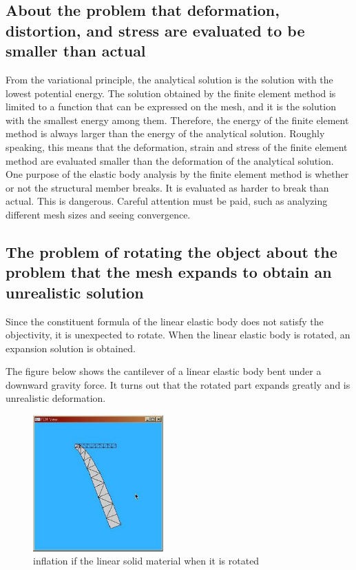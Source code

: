 \subsection{About the problem that deformation, distortion, and stress are evaluated to be smaller than actual}


From the variational principle, the analytical solution is the solution with the lowest potential energy. The solution obtained by the finite element method is limited to a function that can be expressed on the mesh, and it is the solution with the smallest energy among them. Therefore, the energy of the finite element method is always larger than the energy of the analytical solution. Roughly speaking, this means that the deformation, strain and stress of the finite element method are evaluated smaller than the deformation of the analytical solution. One purpose of the elastic body analysis by the finite element method is whether or not the structural member breaks. It is evaluated as harder to break than actual. This is dangerous. Careful attention must be paid, such as analyzing different mesh sizes and seeing convergence.

\subsection{The problem of rotating the object about the problem that the mesh expands to obtain an unrealistic solution}


Since the constituent formula of the linear elastic body does not satisfy the objectivity, it is unexpected to rotate.
When the linear elastic body is rotated, an expansion solution is obtained.

The figure below shows the cantilever of a linear elastic body bent under a downward gravity force. It turns out that the rotated part expands greatly and is unrealistic deformation.

\begin{figure}[hptb]
\begin{center}
\includegraphics[width=5cm]{images/l_beam.eps}
\end{center}
\caption{inflation if the linear solid material when it is rotated}
\end{figure}

